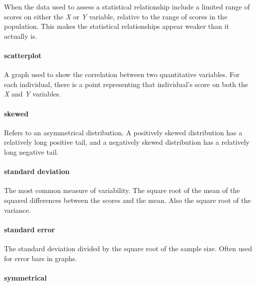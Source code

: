 \documentclass[
]{krantz}
\begin{document}
When the data used to assess a statistical relationship include a limited range of scores on either the \emph{X} or \emph{Y} variable, relative to the range of scores in the population. This makes the statistical relationships appear weaker than it actually is.

\hypertarget{scatterplot-1}{%
\paragraph*{scatterplot}\label{scatterplot-1}}

A graph used to show the correlation between two quantitative variables. For each individual, there is a point representing that individual's score on both the \emph{X} and \emph{Y} variables.

\hypertarget{skewed}{%
\paragraph*{skewed}\label{skewed}}

Refers to an asymmetrical distribution. A positively skewed distribution has a relatively long positive tail, and a negatively skewed distribution has a relatively long negative tail.

\hypertarget{standard-deviation}{%
\paragraph*{standard deviation}\label{standard-deviation}}

The most common measure of variability. The square root of the mean of the squared differences between the scores and the mean. Also the square root of the variance.

\hypertarget{standard-error}{%
\paragraph*{standard error}\label{standard-error}}

The standard deviation divided by the square root of the sample size. Often used for error bars in graphs.

\hypertarget{symmetrical}{%
\paragraph*{symmetrical}\label{symmetrical}}
\end{document}
